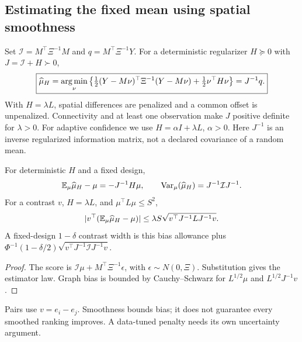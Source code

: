 \subsection{Estimating the fixed mean using spatial smoothness}
Set $\mathcal I=M^\top\Xi^{-1}M$ and $q=M^\top\Xi^{-1}Y$. For a deterministic regularizer $H\succeq0$ with $J=\mathcal I+H\succ0$,
\begin{equation}
\boxed{\widehat\mu_H
=\operatorname*{arg\,min}_\nu\left\{\tfrac12(Y-M\nu)^\top\Xi^{-1}(Y-M\nu)
+\tfrac12\nu^\top H\nu\right\}=J^{-1}q.}
\label{spatiotemporal_bandits:eq:ridge}
\end{equation}
With $H=\lambda L$, spatial differences are penalized and a common offset is unpenalized. Connectivity and at least one observation make $J$ positive definite for $\lambda>0$. For adaptive confidence we use $H=\alpha I+\lambda L$, $\alpha>0$. Here $J^{-1}$ is an inverse regularized information matrix, not a declared covariance of a random mean.

\begin{proposition}
For deterministic $H$ and a fixed design,
\begin{equation}
\mathbb E_\mu\widehat\mu_H-\mu=-J^{-1}H\mu,\qquad
\operatorname{Var}_\mu(\widehat\mu_H)=J^{-1}\mathcal I J^{-1}.
\label{spatiotemporal_bandits:eq:bias-var}
\end{equation}
For a contrast $v$, $H=\lambda L$, and $\mu^\top L\mu\le S^2$,
\begin{equation}
|v^\top(\mathbb E_\mu\widehat\mu_H-\mu)|
\le\lambda S\sqrt{v^\top J^{-1}LJ^{-1}v}.
\label{spatiotemporal_bandits:eq:bias-bound}
\end{equation}
A fixed-design $1-\delta$ contrast width is this bias allowance plus
$\Phi^{-1}(1-\delta/2)\sqrt{v^\top J^{-1}\mathcal I J^{-1}v}$.
\end{proposition}
\begin{proof}
The score is $\mathcal I\mu+M^\top\Xi^{-1}\epsilon$, with $\epsilon\sim N(0,\Xi)$. Substitution gives the estimator law. Graph bias is bounded by Cauchy--Schwarz for $L^{1/2}\mu$ and $L^{1/2}J^{-1}v$.
\end{proof}
Pairs use $v=e_i-e_j$. Smoothness bounds bias; it does not guarantee every smoothed ranking improves. A data-tuned penalty needs its own uncertainty argument.

